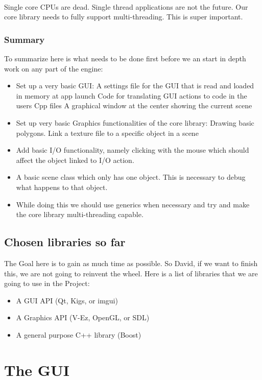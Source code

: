 \documentclass{article}
\begin{document}
	\paragraph{}
	Single core CPUs are dead. Single thread applications are not the future. Our core library needs to fully support multi-threading. This is super important.
	\subsubsection{Summary}
	To summarize here is what needs to be done first before we an start in depth work on any part of the engine:
	\begin{itemize}
		\item Set up a very basic GUI:
		\subitem A settings file for the GUI that is read and loaded in memory at app launch
		\subitem Code for translating GUI actions to code in the users Cpp files
		\subitem A graphical window at the center showing the current scene
		\item Set up very basic Graphics functionalities of the core library:
		\subitem Drawing basic polygons.
		\subitem Link a texture file to a specific object in a scene
		\item Add basic I/O functionality, namely clicking with the mouse which should affect the object linked to I/O action.
		\item A basic scene class which only has one object. This is necessary to debug what happens to that object.
		\item While doing this we should use generics when necessary and try and make the core library multi-threading capable.
	\end{itemize}
	\subsection{Chosen libraries so far}
	The Goal here is to gain as much time as possible. So David, if we want to finish this, we are not going to reinvent the wheel.
	Here is a list of libraries that we are going to use in the Project:
	\begin{itemize}
	\item A GUI API (Qt, Kigs, or imgui)
	\item A Graphics API (V-Ez, OpenGL, or SDL)	
	\item A general purpose C++ library	(Boost)
	\end{itemize}
	
	\section{The GUI}
	
\end{document}
